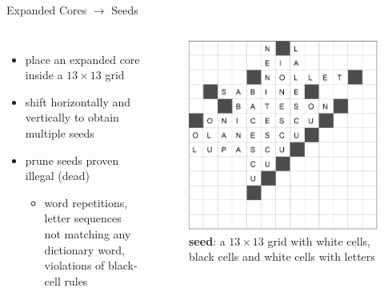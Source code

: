 \documentclass[aspectratio=169,usenames,dvipsnames]{beamer}
\newcommand{\bei}{\begin{itemize}}
\newcommand{\eei}{\end{itemize}}
\newcommand{\ie}{\item}
\numberwithin{equation}{section}
\numberwithin{theorem}{section}
\numberwithin{lem}{section}
\numberwithin{df}{section}
\begin{document}
\begin{frame}{Expanded Cores $\to$ Seeds}

\begin{columns}

\bei
\ie place an expanded core inside a $13\times13$ grid

\medskip

\ie shift horizontally and vertically to obtain multiple seeds

\medskip

\ie prune seeds proven illegal (dead)
\bei
\ie word repetitions, letter sequences not matching any dictionary word, violations of black-cell rules
\eei
\eei


\begin{figure}
\includegraphics[width=0.9\columnwidth]{_plots/alive-0-puzzle-72-2975-1488--1--1.png}
\vspace{-0.25cm}
\caption{{\bf seed}: a $13\times13$ grid with white cells, black cells and white cells with letters}
\end{figure}

\end{columns}

\end{frame}

\end{document}
